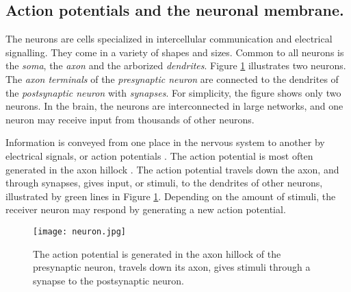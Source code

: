 \documentclass{article}
\begin{document}
\subsection{Action potentials and the neuronal membrane. }\label{APs,neuronal membrane, el.neutrality}
The neurons are cells specialized in intercellular communication and electrical signalling. They come in a variety of shapes and sizes. Common to all neurons is the \textit{soma}, the \textit{axon} and the arborized \textit{dendrites}. Figure  \ref{fig:neuron} illustrates two neurons. The \textit{axon terminals} of the \textit{presynaptic neuron} are connected to the dendrites of the \textit{postsynaptic neuron} with \textit{synapses}. For simplicity, the figure shows only two neurons. In the brain, the neurons are interconnected in large networks, and one neuron may receive input from thousands of other neurons.
  
Information is conveyed from one place in the nervous system to another by electrical signals, or action potentials \cite{Neuroscience}. The action potential is most often generated in the axon hillock \cite{newworldencyclopedia}. The action potential travels down the axon, and through synapses, gives input, or stimuli, to the dendrites of other neurons, illustrated by green lines in Figure \ref{fig:neuron}. Depending on the amount of stimuli, the receiver neuron may respond by generating a new action potential. 


\begin{figure}
  \texttt{[image: neuron.jpg]}
  \caption{The action potential is generated in the axon hillock of the presynaptic neuron, travels down its axon, gives stimuli through a synapse to the postsynaptic neuron. \cite{fig:neuron} }
  \label{fig:neuron}
\end{figure}
\end{document}
